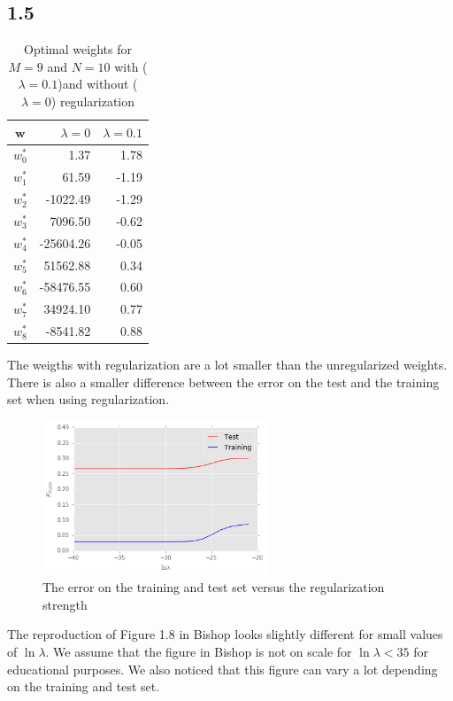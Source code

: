 \documentclass{article}
\begin{document}
\subsection*{1.5}
\begin{table}[H]
\centering
\begin{tabular}{c | r | r}
$\textbf{w}$ & $\lambda=0$ & $\lambda=0.1$ \\
\hline
$w^*_0$ & 1.37 & 1.78 \\
$w^*_1$ & 61.59 & -1.19 \\
$w^*_2$ & -1022.49 & -1.29\\
$w^*_3$ & 7096.50 & -0.62 \\
$w^*_4$ & -25604.26 & -0.05 \\
$w^*_5$ & 51562.88 & 0.34 \\
$w^*_6$ & -58476.55 & 0.60 \\
$w^*_7$ & 34924.10 & 0.77 \\ 
$w^*_8$ & -8541.82 & 0.88 
\end{tabular}
\caption{Optimal weights for $M=9$ and $N=10$ with ($\lambda=0.1$)and without ($\lambda=0$) regularization}
\end{table}

The weigths with regularization are a lot smaller than the unregularized weights. There is also a smaller difference between the error on the test and the training set when using regularization.

\begin{figure}[H]
\centering
\includegraphics[width=0.6\textwidth]{images/effect_regularization.png}
\caption{The error on the training and test set versus the regularization strength}
\end{figure}
The reproduction of Figure 1.8 in Bishop looks slightly different for small values of $\ln \lambda$. We assume that the figure in Bishop is not on scale for $\ln \lambda < 35$ for educational purposes. We also noticed that this figure can vary a lot depending on the training and test set.
\end{document}
